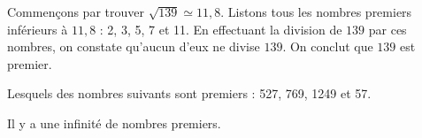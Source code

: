 \begin{prop}
\begin{ex}
                        Commen\c{c}ons par trouver $\sqrt{139} \simeq 11,8$.
                        Listons tous les nombres premiers inf\'erieurs \`a $11,8$ : 
                              2, 3, 5, 7 et 11.
                        En effectuant la division de $139$ par ces nombres, on constate qu'aucun d'eux ne divise $139$.
                        On conclut que $139$ est premier.
                  \end{ex}
                  \begin{exe}\label{exe:arith-1}
                        Lesquels des nombres suivants sont premiers : 
                              527, 769, 1249 et 
                              57.
                  \end{exe}
            \end{prop}
            \begin{thm}
                  Il y a une infinit\'e de nombres premiers.
            \end{thm}
